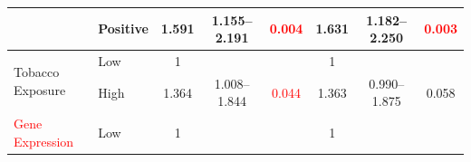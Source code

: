 \documentclass[
paper=landscape,
paper=160mm:90mm, %
fontsize=11pt, %
pagesize, %
parskip=half-, %
]{scrartcl} %
\theoremstyle{mythmstyle} %
\begin{document}
\begin{table}[H]
{\begin{tabular}{|l|l|c|c|c|c|c|c|}
\cline{2-8}
                                        & Positive                                                                            & 1.591                                                                          & 1.155--2.191                                                                   & \textcolor{red}{0.004}                                                        & 1.631                                                                          & 1.182--2.250                                                                   & \textcolor{red}{0.003}                                                         \\ 
\hline
\multirow{2}{*}{Tobacco Exposure}       & {\cellcolor[rgb]{0.62,0.812,0.878}}Low                                              & {\cellcolor[rgb]{0.62,0.812,0.878}}1                                           & {\cellcolor[rgb]{0.62,0.812,0.878}}                                           & {\cellcolor[rgb]{0.62,0.812,0.878}}                                           & {\cellcolor[rgb]{0.62,0.812,0.878}}1                                           & {\cellcolor[rgb]{0.62,0.812,0.878}}                                           & {\cellcolor[rgb]{0.62,0.812,0.878}}                                            \\ 
\cline{2-8}
                                        & High                                                                                & 1.364                                                                          & 1.008--1.844                                                                   & \textcolor{red}{0.044}                                                        & 1.363                                                                          & 0.990--1.875                                                                   & 0.058                                                                          \\ 
\hline
\multirow{2}{*}{\textcolor{red}{Gene Expression}}                & {\cellcolor[rgb]{0.62,0.812,0.878}}Low                                              & {\cellcolor[rgb]{0.62,0.812,0.878}}1                                           & {\cellcolor[rgb]{0.62,0.812,0.878}}                                           & {\cellcolor[rgb]{0.62,0.812,0.878}}                                           & {\cellcolor[rgb]{0.62,0.812,0.878}}1                                           & {\cellcolor[rgb]{0.62,0.812,0.878}}                                           & {\cellcolor[rgb]{0.62,0.812,0.878}}                                            \\ 

\end{tabular}}
\end{table}
\end{document}
